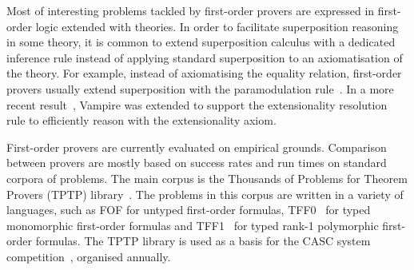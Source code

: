 {%


Most of interesting problems tackled by first-order provers are expressed in first-order logic extended with theories. In order to facilitate superposition reasoning in some theory, it is common to extend superposition calculus with a dedicated inference rule instead of applying standard superposition to an axiomatisation of the theory. For example, instead of axiomatising the equality relation, first-order provers usually extend superposition with the paramodulation rule~\cite{WRCS67,Robinson1969}. In a more recent result~\cite{ATVA14}, Vampire was extended to support the extensionality resolution rule to efficiently reason with the extensionality axiom.

First-order provers are currently evaluated on empirical grounds. Comparison between provers are mostly based on success rates and run times on standard corpora of problems. The main corpus is the Thousands of Problems for Theorem Provers (TPTP) library~\cite{TPTP}. The problems in this corpus are written in a variety of languages, such as FOF for untyped first-order formulas, TFF0~\cite{tff0} for typed monomorphic first-order formulas and TFF1~\cite{tff1} for typed rank-1 polymorphic first-order formulas. The TPTP library is used as a basis for the CASC system competition~\cite{CASC}, organised annually.


}

